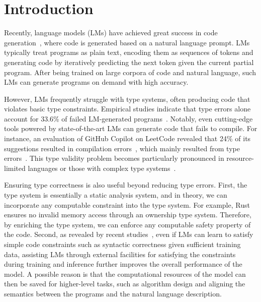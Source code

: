 \section{Introduction} \label{section:intro}
Recently, language models (LMs) have achieved great success in code generation~\cite{li2022competition, DBLP:conf/pldi/Xu0NH22, zheng2023codegeex, DBLP:journals/corr/abs-2108-07732}, where code is generated based on a natural language prompt.
%
LMs typically treat programs as plain text, encoding them as sequences of tokens and generating code by iteratively predicting the next token given the current partial program. After being trained on large corpora of code and natural language, such LMs can generate programs on demand with high accuracy.

However, LMs frequently struggle with type systems, often producing code that violates basic type constraints. 
Empirical studies indicate that type errors alone account for 33.6\% of failed LM-generated programs~\cite{DBLP:journals/ese/TambonDNKDA25, DBLP:journals/corr/abs-2407-06153}. 
Notably, even cutting-edge tools powered by state-of-the-art LMs can generate code that fails to compile.
For instance, an evaluation of GitHub Copilot on LeetCode revealed that 24\% of its suggestions resulted in compilation errors~\cite{DBLP:conf/msr/NguyenN22}, which mainly resulted from type errors~\cite{DBLP:journals/corr/abs-2504-09246}. 
This type validity problem becomes particularly pronounced in resource-limited languages or those with complex type systems~\cite{DBLP:journals/corr/abs-2406-00515,DBLP:journals/corr/abs-2410-03981}.

Ensuring type correctness is also useful beyond reducing type errors. 
First, the type system is essentially a static analysis system, and in theory, we can incorporate any computable constraint into the type system. For example, Rust ensures no invalid memory access through an ownership type system. Therefore, by enriching the type system, we can enforce any computable safety property of the code. 
Second, as revealed by recent studies~\cite{zhang2025gramtransbettercoderepresentation, DBLP:conf/acl/LiangZ0LLXCZZZC25}, even if LMs can learn to satisfy simple code constraints such as syntactic correctness given sufficient training data, assisting LMs through external facilities for satisfying the constraints during training and inference further improves the overall performance of the model. A possible reason is that the computational resources of the model can then be saved for higher-level tasks, such as algorithm design and aligning the semantics between the programs and the natural language description. 

